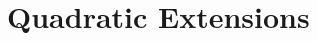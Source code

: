 \documentclass[../notes.tex]{subfiles}
\begin{document}
\section{Quadratic Extensions}
\end{document}
